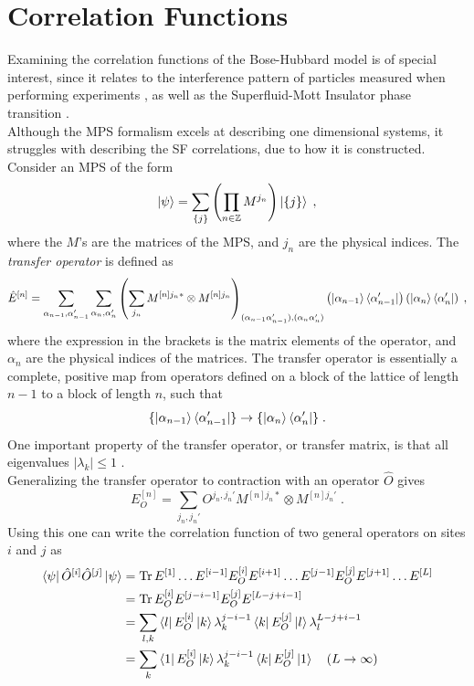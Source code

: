 \section{Correlation Functions}
Examining the correlation functions of the Bose-Hubbard model is of special interest, since it relates to the interference pattern of particles measured when performing experiments \cite{Kashurnikov2002}, as well as the Superfluid-Mott Insulator phase transition \cite{Kuhner2000}.\\  
Although the MPS formalism excels at describing one dimensional systems, it struggles with describing the SF correlations, due to how it is constructed.
Consider an MPS of the form
\begin{equation}
	\ket{\psi} = \sum_{\{ j \} } \left( \prod_{n \in \mathbb{Z}} M^{j_n} \right) \ket{\{ j \}} \; ,
\end{equation}
where the $M$'s are the matrices of the MPS, and $j_n$ are the physical indices. The \textit{transfer operator} is defined as
\begin{equation}
	\hat{E}^{[n]} = \sum_{\alpha_{n-1}, \alpha_{n-1}'} \sum_{\alpha_{n}, \alpha_{n}'} \left( \sum_{j_n} M^{[n] j_n *} \otimes  M^{[n] j_n} \right)_{(\alpha_{n-1} \alpha_{n-1}'),(\alpha_{n}  \alpha_{n}')} \left( \ket{\alpha_{n-1}}\bra{\alpha_{n-1}'} \right) \left( \ket{\alpha_{n}}\bra{\alpha_{n}'} \right) \; ,
\end{equation}   
where the expression in the brackets is the matrix elements of the operator, and $\alpha_n$ are the physical indices of the matrices. The transfer operator is essentially a complete, positive map from operators defined on a block of the lattice of length $n-1$ to a block of length $n$, such that
\begin{equation}
	\{ \ket{\alpha_{n-1}}\bra{\alpha_{n-1}'} \} \to \{ \ket{\alpha_{n}}\bra{\alpha_{n}'} \} \; .
\end{equation}
One important property of the transfer operator, or transfer matrix, is that all eigenvalues $|\lambda_k| \leq 1 $ \cite{schollwock}. \\
Generalizing the transfer operator to contraction with an operator $\hat{O}$ gives
\begin{equation}
	E_{O}^{[n]} = \sum_{j_n , j_n '} O^{j_n , j_n '} M^{[n] j_n *} \otimes  M^{[n] j_n '} \; .
\end{equation}
Using this one can write the correlation function of two general operators on sites $i$ and $j$ as
\begin{align}
	\bra{\psi} \hat{O}^{[i]} \hat{O}^{[j]} \ket{\psi} &= \Tr E^{[1]} \ldots E^{[i-1]} E_{O}^{[i]} E^{[i+1]} \ldots E^{[j-1]} E_{O}^{[j]} E^{[j+1]} \ldots E^{[L]} \nonumber \\
	&= \Tr E_{O}^{[i]} E^{[j-i-1]} E_{O}^{[j]} E^{[L-j+i-1]} \nonumber \\ 
	&= \sum_{l , k} \bra{l} E_{O}^{[i]} \ket{k} \lambda_{k}^{j-i-1} \bra{k} E_{O}^{[j]} \ket{l} \lambda_{l}^{L-j+i-1} \nonumber \\ 
	&= \sum_{k} \bra{1} E_{O}^{[i]} \ket{k} \lambda_{k}^{j-i-1} \bra{k} E_{O}^{[j]} \ket{1} \quad (L \to \infty)
\end{align}
